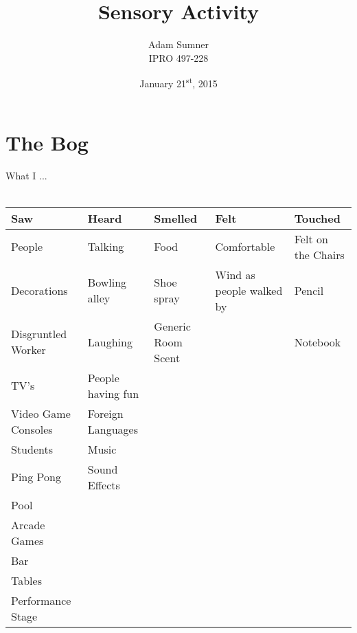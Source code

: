\documentclass[12pt]{article}
\title{\textbf{Sensory Activity}}
\author{Adam Sumner \\ IPRO 497-228}
\date{January 21\textsuperscript{st}, 2015}
\begin{document}
\maketitle

\section*{The Bog}
What I ...
\\
~\\
	\begin{tabularx}{\linewidth}{||>{\centering\arraybackslash}X||>{\centering\arraybackslash}X||>{\centering\arraybackslash}X||>{\centering\arraybackslash}X||>{\centering\arraybackslash}X||}
		\hline
		\textbf{Saw} & \textbf{Heard} & \textbf{Smelled} & \textbf{Felt} & \textbf{Touched} \\ \hline \hline
		People & Talking  & Food  & Comfortable  & Felt on the Chairs \\ \hline
		Decorations & Bowling alley & Shoe spray  & Wind as people walked by  & Pencil \\ \hline
		Disgruntled Worker & Laughing & Generic Room Scent &  & Notebook \\ \hline
		TV's & People having fun &  &  &  \\ \hline
		Video Game Consoles &  Foreign Languages &  &  &  \\ \hline
		Students &  Music &  &  &  \\ \hline	
		Ping Pong & Sound Effects &  &  &  \\ \hline
		Pool &  &  &  &  \\ \hline
		Arcade Games &  &  &  &  \\ \hline
		Bar &  &  &  &  \\ \hline
		Tables &  &  &  &  \\ \hline
		 Performance Stage&  &  &  &  \\ \hline
		
		
	\end{tabularx}
\end{document}

